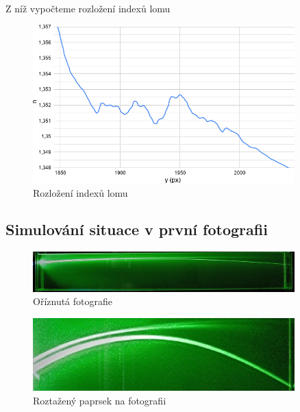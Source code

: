 \documentclass[10pt,a4paper]{article}
\begin{document}
\paragraph{}
Z níž vypočteme rozložení indexů lomu

\begin{figure}[H]
\centering
    \includegraphics[width=0.9\textwidth]{n2-prohozeny.png}
    \caption{Rozložení indexů lomu}
    \label{fig:chart1}
\end{figure}

\subsection{Simulování situace v první fotografii}

\begin{figure}[H]
\centering
    \includegraphics[width=0.9\textwidth]{image8.jpg}
    \caption{Oříznutá fotografie}
    \label{fig:chart1}
\end{figure}

\begin{figure}[H]
\centering
    \includegraphics[width=0.9\textwidth]{rozbihavy-protazeny.jpg}
    \caption{Roztažený paprsek na fotografii}
    \label{fig:chart1}
\end{figure}
\end{document}

